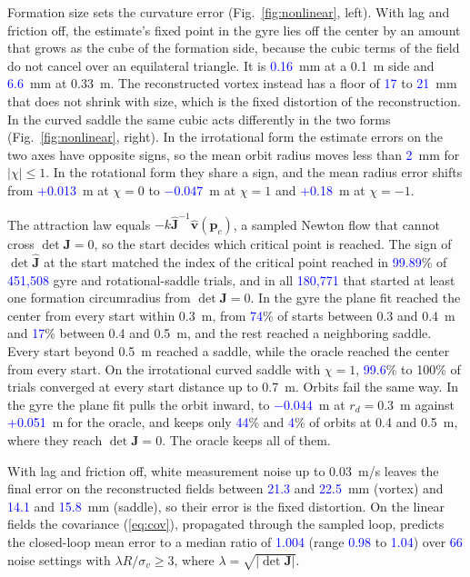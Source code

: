 \documentclass[lettersize,journal]{IEEEtran}
\newcommand{\rev}[1]{\textcolor{blue}{#1}}           %
\begin{document}
Formation size sets the curvature error (Fig.~\ref{fig:nonlinear}, left). With lag and friction off, the estimate's fixed point in the gyre lies off the center by an amount that grows as the cube of the formation side, because the cubic terms of the field do not cancel over an equilateral triangle. It is \rev{0.16}~mm at a 0.1~m side and \rev{6.6}~mm at 0.33~m. The reconstructed vortex instead has a floor of \rev{17} to \rev{21}~mm that does not shrink with size, which is the fixed distortion of the reconstruction. In the curved saddle the same cubic acts differently in the two forms (Fig.~\ref{fig:nonlinear}, right). In the irrotational form the estimate errors on the two axes have opposite signs, so the mean orbit radius moves less than \rev{2}~mm for $|\chi| \le 1$. In the rotational form they share a sign, and the mean radius error shifts from \rev{+0.013}~m at $\chi = 0$ to \rev{$-0.047$}~m at $\chi = 1$ and \rev{+0.18}~m at $\chi = -1$. %

The attraction law equals $-k\hat{\mathbf{J}}^{-1}\hat{\mathbf{v}}(\mathbf{p}_c)$, a sampled Newton flow that cannot cross $\det\mathbf{J} = 0$, so the start decides which critical point is reached. The sign of $\det\hat{\mathbf{J}}$ at the start matched the index of the critical point reached in \rev{99.89}\% of \rev{451,508} gyre and rotational-saddle trials, and in all \rev{180,771} that started at least one formation circumradius from $\det\mathbf{J} = 0$. In the gyre the plane fit reached the center from every start within 0.3~m, from \rev{74}\% of starts between 0.3 and 0.4~m and \rev{17}\% between 0.4 and 0.5~m, and the rest reached a neighboring saddle. Every start beyond 0.5~m reached a saddle, while the oracle reached the center from every start. On the irrotational curved saddle with $\chi = 1$, \rev{99.6}\% to 100\% of trials converged at every start distance up to 0.7~m. Orbits fail the same way. In the gyre the plane fit pulls the orbit inward, to \rev{$-0.044$}~m at $r_d = 0.3$~m against \rev{+0.051}~m for the oracle, and keeps only \rev{44}\% and \rev{4}\% of orbits at 0.4 and 0.5~m, where they reach $\det\mathbf{J} = 0$. The oracle keeps all of them. %

With lag and friction off, white measurement noise up to 0.03~m/s leaves the final error on the reconstructed fields between \rev{21.3} and \rev{22.5}~mm (vortex) and \rev{14.1} and \rev{15.8}~mm (saddle), so their error is the fixed distortion. On the linear fields the covariance (\ref{eq:cov}), propagated through the sampled loop, predicts the closed-loop mean error to a median ratio of \rev{1.004} (range \rev{0.98} to \rev{1.04}) over \rev{66} noise settings with $\lambda R/\sigma_v \ge 3$, where $\lambda = \sqrt{|\det\mathbf{J}|}$. %
\end{document}
